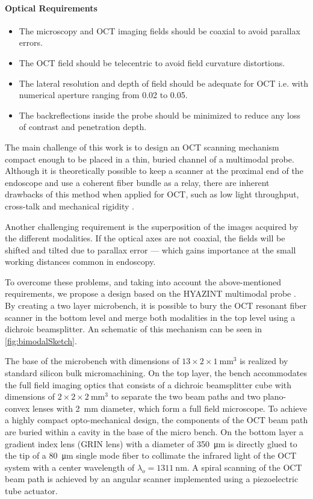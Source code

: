 \paragraph{Optical Requirements}

\begin{itemize}
\item The microscopy and OCT imaging fields should be coaxial to avoid parallax errors. 
\item The OCT field should be telecentric to avoid field curvature distortions.
\item The lateral resolution and depth of field should be adequate for OCT i.e. with numerical aperture ranging from 0.02 to 0.05.
\item The backreflections inside the probe should be minimized to reduce any loss of contrast and penetration depth.
\end{itemize}

The main challenge of this work is to design an OCT scanning mechanism compact enough to be placed in a thin, buried channel of a multimodal probe.  Although it is theoretically possible to keep a scanner at the proximal end of the endoscope and use a coherent fiber bundle as a relay, there are inherent drawbacks of this method when applied for OCT, such as low light throughput, cross-talk and mechanical rigidity \cite{Ford2009}. 

Another challenging requirement is the superposition of the images acquired by the different modalities. If the optical axes are not coaxial, the fields will be shifted and tilted due to parallax error --- which gains importance at the small working distances common in endoscopy.

To overcome these problems, and taking into account the above-mentioned requirements, we propose a design based on the HYAZINT multimodal probe \cite{Blattmann2016}. By creating a two layer microbench, it is possible to bury the OCT resonant fiber scanner in the bottom level and merge both modalities in the top level using a dichroic beamsplitter. An schematic of this mechanism can be seen in \autoref{fig:bimodalSketch}.

The base of the microbench with dimensions of $13 \times 2 \times \SI{1}{\milli\meter^3} $ is realized by standard silicon bulk micromachining. On the top layer, the bench accommodates the full field imaging optics that consists of a dichroic beamsplitter cube with dimensions of $2\times 2 \times  \SI{2}{\milli\meter^3}$ to separate the two beam paths and two plano-convex lenses with \SI{2}{\milli\meter} diameter, which form a full field microscope. To achieve a highly compact opto-mechanical design, the components of the OCT beam path are buried within a cavity in the base of the micro bench. On the bottom layer a gradient index lens (GRIN lens) with a diameter of \SI{350}{\micro\meter} is directly glued to the tip of a \SI{80}{\micro\meter} single mode fiber to collimate the infrared light of the OCT system with a center wavelength of $\lambda_o = \SI{1311}{\nano\meter}$. A spiral scanning of the OCT beam path is achieved by an angular scanner implemented using a piezoelectric tube actuator.

